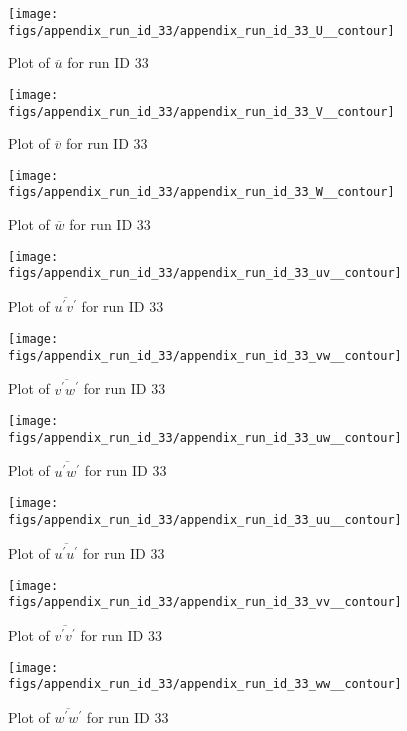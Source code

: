 \begin{figure}[H]
\centering
\texttt{[image: figs/appendix\_run\_id\_33/appendix\_run\_id\_33\_U\_\_contour]}
\caption{Plot of $\overline{u}$ for run ID 33}
\label{fig:appendix_run_id_33_U__contour}
\end{figure}


\begin{figure}[H]
\centering
\texttt{[image: figs/appendix\_run\_id\_33/appendix\_run\_id\_33\_V\_\_contour]}
\caption{Plot of $\overline{v}$ for run ID 33}
\label{fig:appendix_run_id_33_V__contour}
\end{figure}


\begin{figure}[H]
\centering
\texttt{[image: figs/appendix\_run\_id\_33/appendix\_run\_id\_33\_W\_\_contour]}
\caption{Plot of $\overline{w}$ for run ID 33}
\label{fig:appendix_run_id_33_W__contour}
\end{figure}


\begin{figure}[H]
\centering
\texttt{[image: figs/appendix\_run\_id\_33/appendix\_run\_id\_33\_uv\_\_contour]}
\caption{Plot of $\overline{u^\prime v^\prime}$ for run ID 33}
\label{fig:appendix_run_id_33_uv__contour}
\end{figure}


\begin{figure}[H]
\centering
\texttt{[image: figs/appendix\_run\_id\_33/appendix\_run\_id\_33\_vw\_\_contour]}
\caption{Plot of $\overline{v^\prime w^\prime}$ for run ID 33}
\label{fig:appendix_run_id_33_vw__contour}
\end{figure}


\begin{figure}[H]
\centering
\texttt{[image: figs/appendix\_run\_id\_33/appendix\_run\_id\_33\_uw\_\_contour]}
\caption{Plot of $\overline{u^\prime w^\prime}$ for run ID 33}
\label{fig:appendix_run_id_33_uw__contour}
\end{figure}


\begin{figure}[H]
\centering
\texttt{[image: figs/appendix\_run\_id\_33/appendix\_run\_id\_33\_uu\_\_contour]}
\caption{Plot of $\overline{u^\prime u^\prime}$ for run ID 33}
\label{fig:appendix_run_id_33_uu__contour}
\end{figure}


\begin{figure}[H]
\centering
\texttt{[image: figs/appendix\_run\_id\_33/appendix\_run\_id\_33\_vv\_\_contour]}
\caption{Plot of $\overline{v^\prime v^\prime}$ for run ID 33}
\label{fig:appendix_run_id_33_vv__contour}
\end{figure}


\begin{figure}[H]
\centering
\texttt{[image: figs/appendix\_run\_id\_33/appendix\_run\_id\_33\_ww\_\_contour]}
\caption{Plot of $\overline{w^\prime w^\prime}$ for run ID 33}
\label{fig:appendix_run_id_33_ww__contour}
\end{figure}


